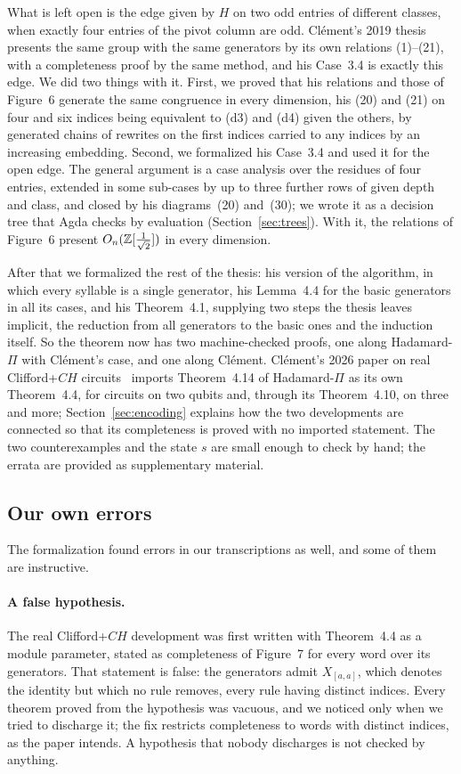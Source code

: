 What is left open is the edge given by $H$ on two odd entries of
different classes, when exactly four entries of the pivot column are
odd. Cl\'ement's 2019 thesis~\cite{clement2019thesis} presents the same
group with the same generators by its own relations (1)--(21), with a
completeness proof by the same method, and his Case~3.4 is exactly
this edge. We did two things with it. First, we proved that his
relations and those of Figure~6 generate the same congruence in every
dimension, his (20) and (21) on four and six indices being equivalent
to (d3) and (d4) given the others, by generated chains of rewrites on
the first indices carried to any indices by an increasing embedding.
Second, we formalized his Case~3.4 and used it for the open edge. The general argument is a
case analysis over the residues of four entries, extended in some
sub-cases by up to three further rows of given depth and class, and
closed by his diagrams~(20) and~(30); we wrote it as a decision tree
that Agda checks by evaluation (Section~\ref{sec:trees}). With it, the
relations of Figure~6 present $O_n(\mathbb{Z}[\frac1{\sqrt2}])$ in every
dimension.

After that we formalized the rest of the thesis: his version of the
algorithm, in which every syllable is a single generator, his
Lemma~4.4 for the basic generators in all its cases, and his
Theorem~4.1, supplying two steps the thesis leaves implicit, the
reduction from all generators to the basic ones and the induction
itself. So the theorem now has two machine-checked proofs, one along
Hadamard-$\Pi$ with Cl\'ement's case, and one along Cl\'ement.
Cl\'ement's 2026 paper on real Clifford+$CH$
circuits~\cite{clement2026realcliffordch} imports Theorem~4.14 of
Hadamard-$\Pi$ as its own Theorem~4.4, for circuits on two qubits and,
through its Theorem~4.10, on three and more; Section~\ref{sec:encoding}
explains how the two developments are connected so that its
completeness is proved with no imported statement. The two
counterexamples and the state $s$ are small enough to check by hand;
the errata are provided as supplementary material.

\subsection{Our own errors}\label{sec:own-errors}

The formalization found errors in our transcriptions as well, and some
of them are instructive.

\paragraph{A false hypothesis.} The real Clifford+$CH$ development was
first written with Theorem~4.4 as a module parameter, stated as
completeness of Figure~7 for every word over its generators. That
statement is false: the generators admit $X_{[a,a]}$, which denotes the
identity but which no rule removes, every rule having distinct indices.
Every theorem proved from the hypothesis was vacuous, and we noticed
only when we tried to discharge it; the fix restricts completeness to
words with distinct indices, as the paper intends. A hypothesis that
nobody discharges is not checked by anything.

